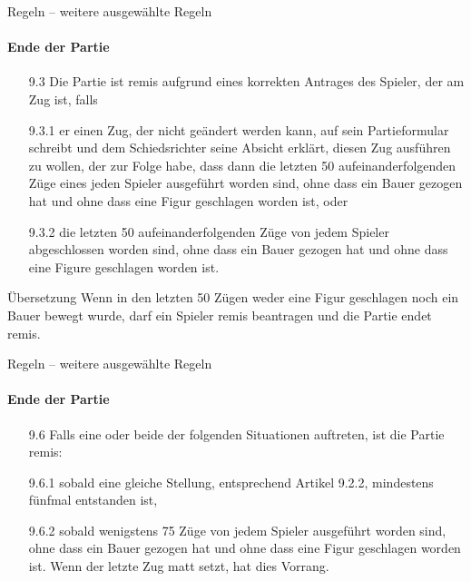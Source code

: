 \documentclass[
  aspectratio=1610,
]{beamer}
\begin{document}
\begin{frame}[<+->]{Regeln – weitere ausgewählte Regeln}
  \framesubtitle{Ende der Partie}
  \begin{itemize}
    \item[9.3] Die Partie ist remis aufgrund eines korrekten Antrages des Spieler, der am
      Zug ist, falls
    \item[9.3.1] er einen Zug, der nicht geändert werden kann, auf sein Partieformular
      schreibt und dem Schiedsrichter seine Absicht erklärt, diesen Zug ausführen zu wollen,
      der zur Folge habe, dass dann die letzten 50 aufeinanderfolgenden Züge eines jeden
      Spieler ausgeführt worden sind, ohne dass ein Bauer gezogen hat und ohne dass eine
      Figur geschlagen worden ist, oder
    \item[9.3.2] die letzten 50 aufeinanderfolgenden Züge von jedem Spieler abgeschlossen
      worden sind, ohne dass ein Bauer gezogen hat und ohne dass eine Figure geschlagen
      worden ist.
  \end{itemize}

  \begin{block}{Übersetzung}
    Wenn in den letzten 50 Zügen weder eine Figur geschlagen noch ein Bauer bewegt wurde,
    darf ein Spieler remis beantragen und die Partie endet remis.
  \end{block}
\end{frame}

\begin{frame}[<+->]{Regeln – weitere ausgewählte Regeln}
  \framesubtitle{Ende der Partie}
  \begin{itemize}
    \item[9.6] Falls eine oder beide der folgenden Situationen auftreten, ist die Partie
      remis:
    \item[9.6.1] sobald eine gleiche Stellung, entsprechend Artikel 9.2.2, mindestens
      fünfmal entstanden ist,
    \item[9.6.2] sobald wenigstens 75 Züge von jedem Spieler ausgeführt worden sind, ohne
      dass ein Bauer gezogen hat und ohne dass eine Figur geschlagen worden ist.
      Wenn der letzte Zug matt setzt, hat dies Vorrang.
  \end{itemize}
\end{frame}
\end{document}
